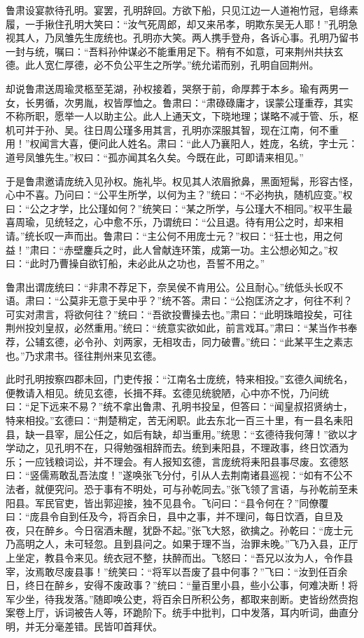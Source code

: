 鲁肃设宴款待孔明。宴罢，孔明辞回。方欲下船，只见江边一人道袍竹冠，皂绦素履，一手揪住孔明大笑曰：“汝气死周郎，却又来吊孝，明欺东吴无人耶！”孔明急视其人，乃凤雏先生庞统也。孔明亦大笑。两人携手登舟，各诉心事。孔明乃留书一封与统，嘱曰：“吾料孙仲谋必不能重用足下。稍有不如意，可来荆州共扶玄德。此人宽仁厚德，必不负公平生之所学。”统允诺而别，孔明自回荆州。

却说鲁肃送周瑜灵柩至芜湖，孙权接着，哭祭于前，命厚葬于本乡。瑜有两男一女，长男循，次男胤，权皆厚恤之。鲁肃曰：“肃碌碌庸才，误蒙公瑾重荐，其实不称所职，愿举一人以助主公。此人上通天文，下晓地理；谋略不减于管、乐，枢机可并于孙、吴。往日周公瑾多用其言，孔明亦深服其智，现在江南，何不重用！”权闻言大喜，便问此人姓名。肃曰：“此人乃襄阳人，姓庞，名统，字士元：道号凤雏先生。”权曰：“孤亦闻其名久矣。今既在此，可即请来相见。”

于是鲁肃邀请庞统入见孙权。施礼毕。权见其人浓眉掀鼻，黑面短髯，形容古怪，心中不喜。乃问曰：“公平生所学，以何为主？”统曰：“不必拘执，随机应变。”权曰：“公之才学，比公瑾如何？”统笑曰：“某之所学，与公瑾大不相同。”权平生最喜周瑜，见统轻之，心中愈不乐，乃谓统曰：“公且退。待有用公之时，却来相请。”统长叹一声而出。鲁肃曰：“主公何不用庞士元？”权曰：“狂士也，用之何益！”肃曰：“赤壁鏖兵之时，此人曾献连环策，成第一功。主公想必知之。”权曰：“此时乃曹操自欲钉船，未必此从之功也，吾誓不用之。”

鲁肃出谓庞统曰：“非肃不荐足下，奈吴侯不肯用公。公且耐心。”统低头长叹不语。肃曰：“公莫非无意于吴中乎？”统不答。肃曰：“公抱匡济之才，何往不利？可实对肃言，将欲何往？”统曰：“吾欲投曹操去也。”肃曰：“此明珠暗投矣，可往荆州投刘皇叔，必然重用。”统曰：“统意实欲如此，前言戏耳。”肃曰：“某当作书奉荐，公辅玄德，必令孙、刘两家，无相攻击，同力破曹。”统曰：“此某平生之素志也。”乃求肃书。径往荆州来见玄德。

此时孔明按察四郡未回，门吏传报：“江南名士庞统，特来相投。”玄德久闻统名，便教请入相见。统见玄德，长揖不拜。玄德见统貌陋，心中亦不悦，乃问统曰：“足下远来不易？”统不拿出鲁肃、孔明书投呈，但答曰：“闻皇叔招贤纳士，特来相投。”玄德曰：“荆楚稍定，苦无闲职。此去东北一百三十里，有一县名耒阳县，缺一县宰，屈公任之，如后有缺，却当重用。”统思：“玄德待我何薄！”欲以才学动之，见孔明不在，只得勉强相辞而去。统到耒阳县，不理政事，终日饮酒为乐；一应钱粮词讼，并不理会。有人报知玄德，言庞统将耒阳县事尽废。玄德怒曰：“竖儒焉敢乱吾法度！”遂唤张飞分付，引从人去荆南诸县巡视：“如有不公不法者，就便究问。恐于事有不明处，可与孙乾同去。”张飞领了言语，与孙乾前至耒阳县。军民官吏，皆出郭迎接，独不见县令。飞问曰：“县令何在？”同僚覆曰：“庞县令自到任及今，将百余日，县中之事，并不理问，每日饮酒，自旦及夜，只在醉乡。今日宿酒未醒，犹卧不起。”张飞大怒，欲擒之。孙乾曰：“庞士元乃高明之人，未可轻忽。且到县问之。如果于理不当，治罪未晚。”飞乃入县，正厅上坐定，教县令来见。统衣冠不整，扶醉而出。飞怒曰：“吾兄以汝为人，令作县宰，汝焉敢尽废县事！”统笑曰：“将军以吾废了县中何事？”飞曰：“汝到任百余日，终日在醉乡，安得不废政事？”统曰：“量百里小县，些小公事，何难决断！将军少坐，待我发落。”随即唤公吏，将百余日所积公务，都取来剖断。吏皆纷然赍抱案卷上厅，诉词被告人等，环跪阶下。统手中批判，口中发落，耳内听词，曲直分明，并无分毫差错。民皆叩首拜伏。

